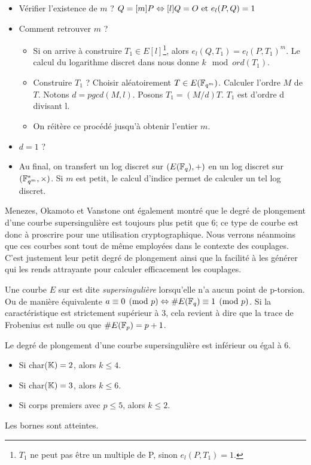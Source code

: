 \begin{itemize}[label=$\bullet$]
    \item Vérifier l'existence de $m$ ? $Q = [m]P \Leftrightarrow [l]Q = O{} \text{ et } e_l(P, Q) = 1$
    \item Comment retrouver $m$ ?
    \begin{itemize}[label = --]
        \item Si on arrive à construire $T_1 \in E[l]$\footnote{$T_1$ ne peut pas être un multiple de P, sinon $e_l(P, T_1) = 1$.}, alors $e_l(Q, T_1) = e_l(P, T_1)^m$. Le calcul du logarithme discret dans  nous donne $k \mod ord(T_1)$.
        \item Construire $T_1$ ? Choisir aléatoirement $T \in E(\mathbb{F}_{q^m})$. Calculer l'ordre $M$ de $T$. Notons $d = pgcd(M, l)$. Posons $T_1 = (M/d)T$. $T_1$ est d'ordre d divisant l.
        \item On réitère ce procédé jusqu'à obtenir l'entier $m$.
    \end{itemize}
    \item $d = 1$ ?
    \item Au final, on transfert un log discret sur $(E(\mathbb{F}_{q}), +)$ en un log discret sur $(\mathbb{F}_{q^m}^*, \times)$. Si $m$ est petit, le calcul d'indice permet de calculer un tel log discret.
\end{itemize}

Menezes, Okamoto et Vanstone ont également montré que le degré de plongement d'une courbe supersingulière est toujours plus petit que $6$; ce type de courbe est donc à proscrire pour une utilisation cryptographique. Nous verrons néanmoins que ces courbes sont tout de même employées dans le contexte des couplages. C'est justement leur petit degré de plongement ainsi que la facilité à les générer qui les rends attrayante pour calculer efficacement les couplages. 

\begin{definition}
Une courbe $E$ sur  est dite \emph{supersingulière} lorsqu'elle n'a aucun point de p-torsion. Ou de manière équivalente $a \equiv 0 \pmod p \Leftrightarrow \# E(\mathbb{F}_{q}) \equiv 1 \pmod p$. Si la caractéristique est strictement supérieur à 3, cela revient à dire que la trace de Frobenius est nulle ou que $\# E(\mathbb{F}_{p}) = p + 1$.
\end{definition}

\begin{theoreme}
Le degré de plongement d'une courbe supersingulière est inférieur ou égal à $6$.
\begin{itemize}[label=--]
    \item Si char($\mathbb{K}{}) = 2$, alors $k \leq 4$.
    \item Si char($\mathbb{K}{}) = 3$, alors $k \leq 6$.
    \item Si corps premiers avec $p \leq 5$, alors $k \leq 2$.
\end{itemize}
Les bornes sont atteintes.
\end{theoreme}


